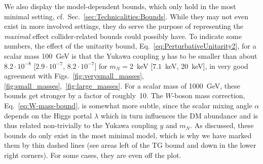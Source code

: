 We also display the model-dependent bounds, which only hold in the most minimal setting, cf.\ Sec.~\ref{sec:Technicalities:Bounds}. While they may not even exist in more involved settings, they do serve the purpose of representing the \emph{maximal} effect collider-related bounds could possibly have. To indicate some numbers, the effect of the unitarity bound, Eq.~\eqref{eq:PerturbativeUnitarity2}, for a scalar mass 100~GeV is that the Yukawa coupling $y$ has to be smaller than about $8.2\cdot 10^{-8}$ [$2.9\cdot 10^{-7}$, $8.2\cdot 10^{-7}$] for $m_N = 2$~keV [$7.1$~keV, $20$~keV], in very good agreement with Figs.~\ref{fig:verysmall_masses}, \ref{fig:small_masses},~\ref{fig:large_masses}. For a scalar mass of 1000~GeV, these bounds get stronger by a factor of roughly~10.  The $W$-boson mass correction, Eq.~\eqref{eq:W-mass-bound}, is somewhat more subtle, since the scalar mixing angle $\alpha$ depends on the Higgs portal $\lambda$ which in turn influences the DM abundance and is thus related non-trivially to the Yukawa coupling $y$ and $m_N$. As discussed, these bounds do only exist in the most minimal model, which is why we have marked them by thin dashed lines (see areas left of the TG bound and down in the lower right corners). For some cases, they are even off the plot.

